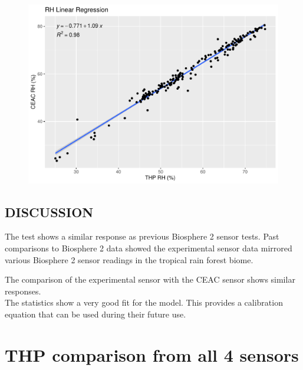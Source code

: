 \documentclass[
  letterpaper,
  DIV=11,
  numbers=noendperiod]{scrartcl}
\begin{document}
\begin{figure}[H]

{\centering \includegraphics{THP_CEAC_20231102_files/figure-pdf/data_plot_stat_rh-5.pdf}

}

\end{figure}

\hypertarget{discussion}{%
\subsection{DISCUSSION}\label{discussion}}

The test shows a similar response as previous Biosphere 2 sensor tests.
Past comparisons to Biosphere 2 data showed the experimental sensor data
mirrored various Biosphere 2 sensor readings in the tropical rain forest
biome.

The comparison of the experimental sensor with the CEAC sensor shows
similar responses.\\
The statistics show a very good fit for the model. This provides a
calibration equation that can be used during their future use.

\hypertarget{thp-comparison-from-all-4-sensors}{%
\section{THP comparison from all 4
sensors}\label{thp-comparison-from-all-4-sensors}}
\end{document}
